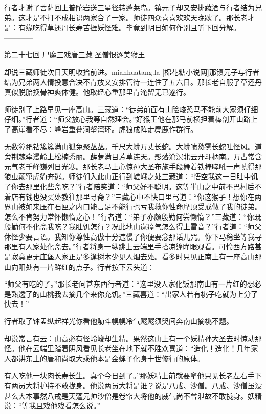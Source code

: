 \documentclass[12pt,UTF8]{ctexbook}
\begin{document}
行者才谢了菩萨回上普陀岩送三星径转蓬莱岛。镇元子却又安排蔬酒与行者结为兄弟。这才是不打不成相识两家合了一家。师徒四众喜喜欢欢天晚歇了。那长老才是：有缘吃得草还丹长寿苦捱妖怪难。毕竟到明日如何作别且听下回分解。
------------

第二十七回 尸魔三戏唐三藏 圣僧恨逐美猴王

却说三藏师徒次日天明收拾前进。mianhuatang.la [棉花糖小说网]那镇元子与行者结为兄弟两人情投意合决不肯放又安排管待一连住了五六日。那长老自服了草还丹真似脱胎换骨神爽体健。他取经心重那里肯淹留无已遂行。

师徒别了上路早见一座高山。三藏道：“徒弟前面有山险峻恐马不能前大家须仔细仔细。”行者道：“师父放心我等自然理会。”好猴王他在那马前横担着棒剖开山路上了高崖看不尽：峰岩重叠涧壑湾环。虎狼成阵走麂鹿作群行。

无数獐豝钻簇簇满山狐兔聚丛丛。千尺大蟒万丈长蛇。大蟒喷愁雾长蛇吐怪风。道旁荆棘牵漫岭上松楠秀丽。薜萝满目芳草连天。影落沧溟北云开斗柄南。万古常含元气老千峰巍列日光寒。那长老马上心惊孙大圣布施手段舞着铁棒哮吼一声唬得那狼虫颠窜虎豹奔逃。师徒们入此山正行到嵯峨之处三藏道：“悟空我这一日肚中饥了你去那里化些斋吃？”行者陪笑道：“师父好不聪明。这等半山之中前不巴村后不着店有钱也没买处教往那里寻斋？”三藏心中不快口里骂道：“你这猴子！想你在两界山被如来压在石匣之内口能言足不能行也亏我救你性命摩顶受戒做了我的徒弟。怎么不肯努力常怀懒惰之心！”行者道：“弟子亦颇殷勤何尝懒惰？”三藏道：“你既殷勤何不化斋我吃？我肚饥怎行？况此地山岚瘴气怎么得上雷音？”行者道：“师父休怪少要言语。我知你尊性高傲十分违慢了你便要念那话儿咒。你下马稳坐等我寻那里有人家处化斋去。”行者将身一纵跳上云端里手搭凉篷睁眼观看。可怜西方路甚是寂寞更无庄堡人家正是多逢树木少见人烟去处。看多时只见正南上有一座高山那山向阳处有一片鲜红的点子。行者按下云头道：

“师父有吃的了。”那长老问甚东西行者道：“这里没人家化饭那南山有一片红的想必是熟透了的山桃我去摘几个来你充饥。”三藏喜道：“出家人若有桃子吃就为上分了快去！”

行者取了钵盂纵起祥光你看他觔斗幌幌冷气飕飕须臾间奔南山摘桃不题。

却说常言有云：山高必有怪岭峻却生精。果然这山上有一个妖精孙大圣去时惊动那怪。他在云端里踏着阴风看见长老坐在地下就不胜欢喜道：“造化！造化！几年家人都讲东土的唐和尚取大乘他本是金蝉子化身十世修行的原体。

有人吃他一块肉长寿长生。真个今日到了。”那妖精上前就要拿他只见长老左右手下有两员大将护持不敢拢身。他说两员大将是谁？说是八戒、沙僧。八戒、沙僧虽没甚么大本事然八戒是天蓬元帅沙僧是卷帘大将他的威气尚不曾泄故不敢拢身。妖精说：“等我且戏他戏看怎么说。”
\end{document}
